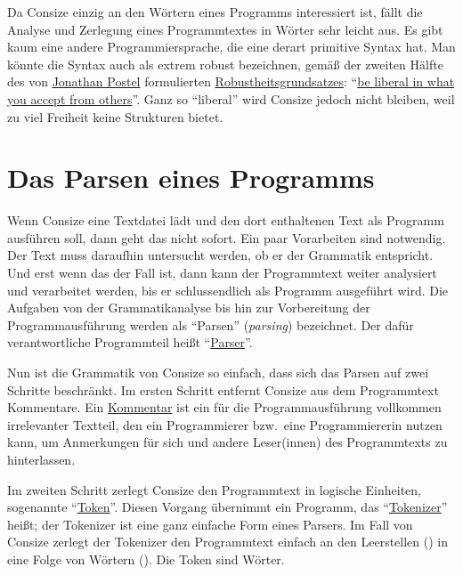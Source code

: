 Da Consize einzig an den Wörtern eines Programms interessiert ist, fällt die Analyse und Zerlegung eines Programmtextes in Wörter sehr leicht aus. Es gibt kaum eine andere Programmiersprache, die eine derart primitive Syntax hat. Man könnte die Syntax auch als extrem robust bezeichnen, gemäß der zweiten Hälfte des von \href{http://de.wikipedia.org/wiki/Jonathan\_Postel}{{\sc Jonathan Postel}} formulierten \href{http://de.wikipedia.org/wiki/Robustheitsgrundsatz}{Robustheitsgrundsatzes}: "`\href{http://tools.ietf.org/html/rfc761#page-13}{be liberal in what you accept from others}"'.
Ganz so "`liberal"' wird Consize jedoch nicht bleiben, weil zu viel Freiheit keine Strukturen bietet.

\section{Das Parsen eines Programms}

Wenn Consize eine Textdatei lädt und den dort enthaltenen Text als Programm ausführen soll, dann geht das nicht sofort. Ein paar Vorarbeiten sind notwendig. Der Text muss daraufhin untersucht werden, ob er der Grammatik entspricht. Und erst wenn das der Fall ist, dann kann der Programmtext weiter analysiert und verarbeitet werden, bis er schlussendlich als Programm ausgeführt wird. Die Aufgaben von der Grammatikanalyse bis hin zur Vorbereitung der Programmausführung werden als "`Parsen"' (\emph{parsing}) bezeichnet. Der dafür verantwortliche Programmteil heißt "`\href{http://de.wikipedia.org/wiki/Parser}{Parser}"'.

Nun ist die Grammatik von Consize so einfach, dass sich das Parsen auf zwei Schritte beschränkt. Im ersten Schritt entfernt Consize aus dem Programmtext Kommentare. Ein \href{http://de.wikipedia.org/wiki/Kommentar\_(Programmierung)}{Kommentar} ist ein für die Pro\-gramm\-aus\-füh\-rung vollkommen irrelevanter Textteil, den ein Programmierer bzw.\ eine Programmiererin nutzen kann, um Anmerkungen für sich und andere Leser(innen) des Programmtexts zu hinterlassen.

Im zweiten Schritt zerlegt Consize den Programmtext in logische Einheiten, sogenannte "`\href{http://de.wikipedia.org/wiki/Token\_(Compilerbau)}{Token}"'. Diesen Vorgang übernimmt ein Programm, das "`\href{http://de.wikipedia.org/wiki/Tokenizer}{Tokenizer}"' heißt; der Tokenizer ist eine ganz einfache Form eines Parsers. Im Fall von Consize zerlegt der Tokenizer den Programmtext einfach an den Leerstellen () in eine Folge von Wörtern (). Die Token sind Wörter. 

